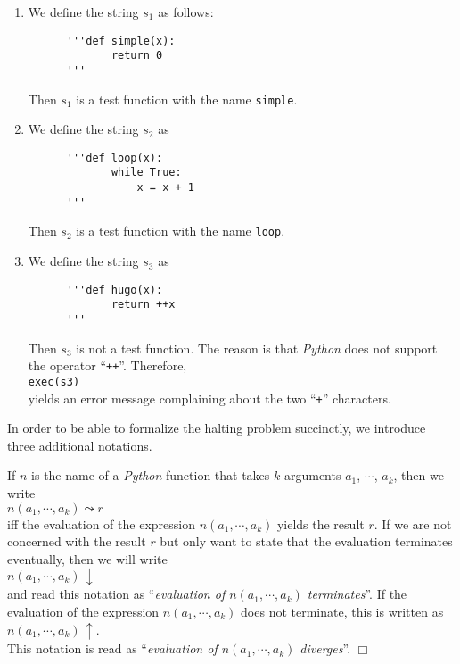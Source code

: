 \examplesEng
\begin{enumerate}
\item We define the string $s_1$ as follows:
      \begin{verbatim}
      '''def simple(x): 
             return 0
      '''
      \end{verbatim}
      \vspace*{-0.8cm}

      Then $s_1$ is a test function with the name \texttt{simple}.
\item We define the string $s_2$ as
      \begin{verbatim}
      '''def loop(x): 
             while True: 
                 x = x + 1
      '''
      \end{verbatim}
      \vspace*{-0.8cm}

      Then $s_2$ is a test function with the name \texttt{loop}. 
\item We define the string $s_3$ as
      \begin{verbatim}
      '''def hugo(x):
             return ++x
      '''
      \end{verbatim}
      \vspace*{-0.8cm}

      Then $s_3$ is not a test function.  The reason is that \textsl{Python} does not support the operator
      ``\texttt{++}''.  Therefore, 
      \\[0.2cm]
      \hspace*{1.3cm}
      \texttt{exec(s3)}
      \\[0.2cm]
      yields an error message complaining about the two ``\texttt{+}'' characters.
\end{enumerate}
In order to be able to formalize the halting problem succinctly, we introduce three additional
notations.

\begin{Notation}[$\leadsto$, $\downarrow$, $\uparrow$]
If $n$ is the name of a \textsl{Python} function that takes $k$ arguments $a_1$, $\cdots$, $a_k$,
then we write 
\\[0.2cm]
\hspace*{1.3cm}
 $n(a_1, \cdots, a_k) \leadsto r$ 
\\[0.2cm]
iff the evaluation of the expression $n(a_1, \cdots, a_k)$ yields the result $r$.  If we are not
concerned with the result $r$ but only want to state that the evaluation terminates eventually,
then we will write
\\[0.2cm]
\hspace*{1.3cm} $n(a_1, \cdots, a_k) \,\downarrow$ \\[0.3cm]
and read this notation as ``\emph{evaluation of $n(a_1, \cdots, a_k)$ terminates}''.
If the evaluation of the expression $n(a_1, \cdots, a_k)$ does \underline{not} terminate, this is
written as \\[0.2cm]
\hspace*{1.3cm}
 $n(a_1, \cdots, a_k) \,\uparrow$. 
\\[0.2cm]
This notation is read as ``\emph{evaluation of $n(a_1, \cdots, a_k)$ diverges}''.
\hspace*{\fill} $\Box$
\end{Notation}

